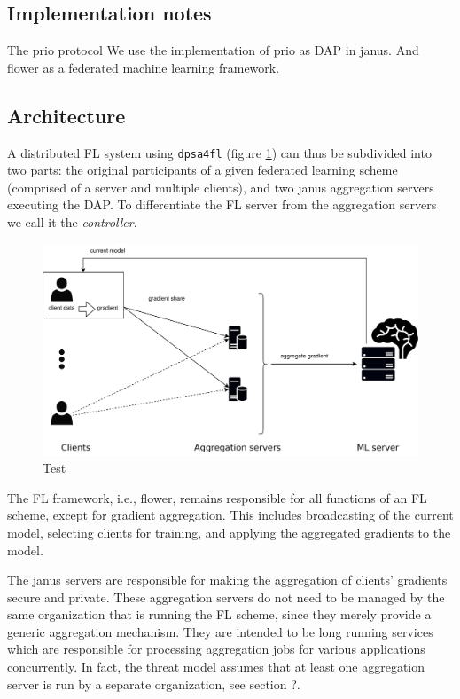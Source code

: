 \documentclass{article}
\begin{document}
\subsection{Implementation notes}
The prio protocol 
We use the implementation of prio as DAP in janus. And flower as a federated
machine learning framework.

\subsection{Architecture}
A distributed FL system using \texttt{dpsa4fl} (figure \ref{fig:architecture}) can thus be
subdivided into two parts: the original participants of a given federated
learning scheme (comprised of a server and multiple clients), and two
janus aggregation servers executing the DAP. To differentiate the FL server from
the aggregation servers we call it the \textit{controller}.

\begin{figure}[h]
  \centering
  \includegraphics[width=\columnwidth]{assets/dpsa-overview-2-edit_no_explanations-2023-08-22.drawio.pdf}
  \caption{Test}
  \label{fig:architecture}
\end{figure}

The FL framework, i.e., flower, remains responsible for all functions of an FL
scheme, except for gradient aggregation. This includes broadcasting of the
current model, selecting clients for training, and applying the aggregated
gradients to the model.

The janus servers are responsible for making the aggregation of clients'
gradients secure and private. These aggregation servers do not need to be
managed by the same organization that is running the FL scheme, since they
merely provide a generic aggregation mechanism. They are intended to be long
running services which are responsible for processing aggregation jobs for
various applications concurrently. In fact, the threat model assumes that at
least one aggregation server is run by a separate organization, see section ?.
\end{document}
